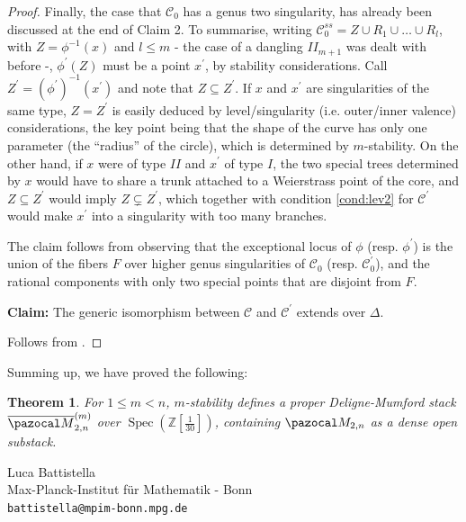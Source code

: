 \documentclass[11pt]{amsart}
\newcommand{\oM}{\overline{\pazocal M}}
\newcommand{\dvr}{\Delta}
\theoremstyle{plain}
\newtheorem{thm}{Theorem}[section]
\theoremstyle{definition}
\begin{document}
\begin{proof}
 Finally, the case that $\mathcal C_0$ has a genus two singularity, has already been discussed at the end of Claim 2. To summarise, writing $\mathcal C^{ss}_0=Z\cup R_1\cup\ldots\cup R_l$, with $Z=\phi^{-1}(x)$ and $l\leq m$ - the case of a dangling $I\!I_{m+1}$ was dealt with before -, $\phi^\prime(Z)$ must be a point $x^\prime$, by stability considerations. Call $Z^\prime=(\phi^\prime)^{-1}(x^\prime)$ and note that $Z\subseteq Z^\prime$. If $x$ and $x^\prime$ are singularities of the same type, $Z=Z^\prime$ is easily deduced by level/singularity (i.e. outer/inner valence) considerations, the key point being that the shape of the curve has only one parameter (the ``radius'' of the circle), which is determined by $m$-stability. On the other hand, if $x$ were of type $I\!I$ and $x^\prime$ of type $I$, the two special trees determined by $x$ would have to share a trunk attached to a Weierstrass point of the core, and $Z\subseteq Z^\prime$ would imply $Z\subsetneq Z^\prime$, which together with condition \eqref{cond:lev2} for $\mathcal C^\prime$ would make $x^\prime$ into a singularity with too many branches.
 
 The claim follows from observing that the exceptional locus of $\phi$ (resp. $\phi^\prime$) is the union of the fibers $F$ over higher genus singularities of $\mathcal C_0$ (resp. $\mathcal C_0^\prime$), and the rational components with only two special points that are disjoint from $F$.
 
 \textbf{Claim:} The generic isomorphism between $\mathcal C$ and $\mathcal C^\prime$ extends over $\dvr$.
 
 Follows from \cite[Lemma 1.13]{Debarre}.
\end{proof}

Summing up, we have proved the following:
\begin{thm}
 For $1\leq m <n$, $m$-stability defines a proper Deligne-Mumford stack $\oM_{2,n}^{(m)}$ over $\operatorname{Spec}(\mathbb Z[\frac{1}{30}])$, containing $\pazocal M_{2,n}$ as a dense open substack.
\end{thm}





\medskip

\noindent Luca Battistella\\
Max-Planck-Institut f\"ur Mathematik - Bonn \\
\texttt{battistella@mpim-bonn.mpg.de}\\
\end{document}
